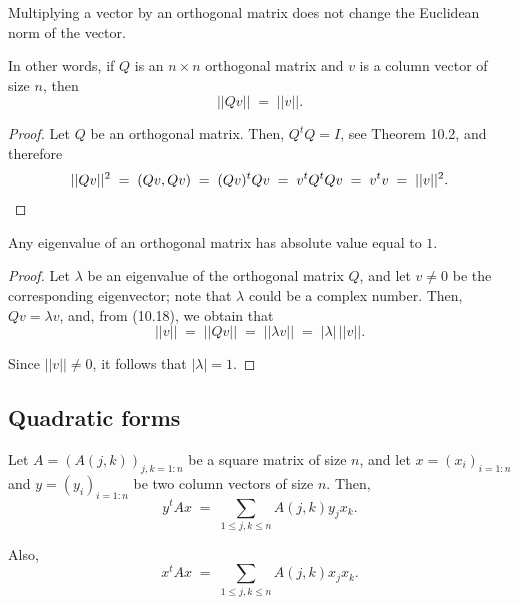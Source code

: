
\begin{lemma}
Multiplying a vector by an orthogonal matrix does not change the Euclidean norm of
the vector.

In other words, if $Q$ is an $n \times n$ orthogonal matrix and $v$ is a column
vector of size $n$, then
\begin{equation}
||Qv|| \;=\; ||v||.
\end{equation}
\end{lemma}

\begin{proof}
Let $Q$ be an orthogonal matrix. Then, $Q^tQ = I$, see Theorem 10.2, and therefore
\[
||Qv||^2 \;=\; (Qv,Qv) \;=\; (Qv)^tQv \;=\; v^tQ^tQv \;=\; v^tv \;=\; ||v||^2.
\qedhere
\]
\end{proof}

\begin{lemma}
Any eigenvalue of an orthogonal matrix has absolute value equal to $1$.
\end{lemma}

\begin{proof}
Let $\lambda$ be an eigenvalue of the orthogonal matrix $Q$, and let $v \ne 0$ be the
corresponding eigenvector; note that $\lambda$ could be a complex number. Then,
$Qv = \lambda v$, and, from (10.18), we obtain that
\[
||v|| \;=\; ||Qv|| \;=\; ||\lambda v|| \;=\; |\lambda|\,||v||.
\]

Since $||v|| \ne 0$, it follows that $|\lambda| = 1$.
\end{proof}

\subsection{Quadratic forms}

\begin{lemma}
Let $A = (A(j,k))_{j,k=1:n}$ be a square matrix of size $n$, and let $x =
(x_i)_{i=1:n}$ and $y = (y_i)_{i=1:n}$ be two column vectors of size $n$. Then,
\begin{equation}
y^tAx \;=\; \sum_{1\le j,k\le n} A(j,k)y_jx_k.
\end{equation}

Also,
\begin{equation}
x^tAx \;=\; \sum_{1\le j,k\le n} A(j,k)x_jx_k.
\end{equation}
\end{lemma}

